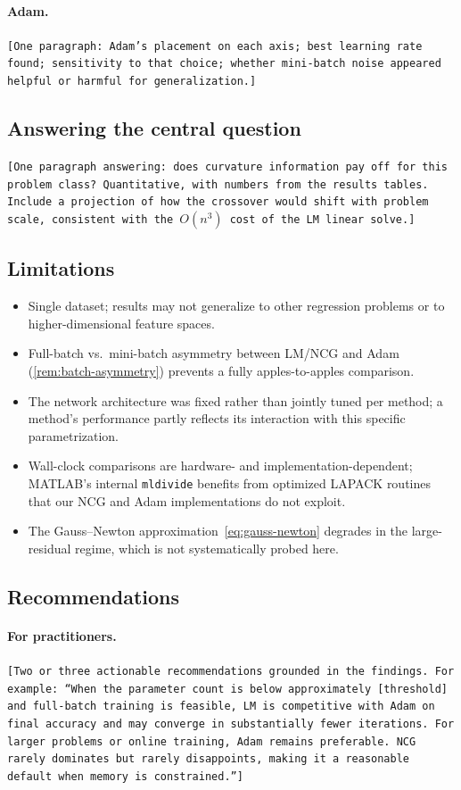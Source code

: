 \documentclass[11pt,letterpaper]{article}
\theoremstyle{definition}
\begin{document}
\paragraph{Adam.}
\texttt{[One paragraph: Adam's placement on each axis; best learning rate
found; sensitivity to that choice; whether mini-batch noise appeared
helpful or harmful for generalization.]}
 
\subsection{Answering the central question}
 
\texttt{[One paragraph answering: does curvature information pay off for
this problem class? Quantitative, with numbers from the results tables.
Include a projection of how the crossover would shift with problem scale,
consistent with the $O(n^3)$ cost of the LM linear solve.]}
 
\subsection{Limitations}
 
\begin{itemize}
  \item Single dataset; results may not generalize to other regression
    problems or to higher-dimensional feature spaces.
  \item Full-batch vs.\ mini-batch asymmetry between LM/NCG and Adam
    (\cref{rem:batch-asymmetry}) prevents a fully apples-to-apples
    comparison.
  \item The network architecture was fixed rather than jointly tuned per
    method; a method's performance partly reflects its interaction with
    this specific parametrization.
  \item Wall-clock comparisons are hardware- and implementation-dependent;
    MATLAB's internal \texttt{mldivide} benefits from optimized LAPACK
    routines that our NCG and Adam implementations do not exploit.
  \item The Gauss--Newton approximation~\cref{eq:gauss-newton} degrades in
    the large-residual regime, which is not systematically probed here.
\end{itemize}
 
\subsection{Recommendations}
 
\paragraph{For practitioners.}
\texttt{[Two or three actionable recommendations grounded in the findings.
For example: ``When the parameter count is below approximately
\texttt{[threshold]} and full-batch training is feasible, LM is
competitive with Adam on final accuracy and may converge in substantially
fewer iterations. For larger problems or online training, Adam remains
preferable. NCG rarely dominates but rarely disappoints, making it a
reasonable default when memory is constrained.'']}
 
\end{document}
